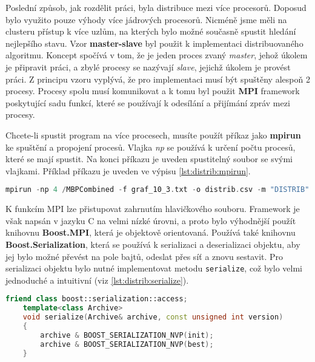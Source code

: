 Poslední způsob, jak rozdělit práci, byla distribuce mezi více procesorů.
Doposud bylo využito pouze výhody více jádrových procesorů.
Nicméně jsme měli na clusteru přístup k více uzlům, na kterých bylo možné současně spustit hledání nejlepšího stavu.
Vzor \textbf{master-slave} byl použit k implementaci distribuovaného algoritmu.
Koncept spočívá v tom, že je jeden proces zvaný \textit{master}, jehož úkolem je připravit práci, a zbylé procesy se nazývají \textit{slave}, jejichž úkolem je provést práci.
Z principu vzoru vyplývá, že pro implementaci musí být spuštěny alespoň 2 procesy.
Procesy spolu musí komunikovat a k tomu byl použit \textbf{MPI} framework poskytující sadu funkcí, které se používají k odesílání a přijímání zpráv mezi procesy.

Chcete-li spustit program na více procesech, musíte použít příkaz jako \textbf{mpirun} ke spuštění a propojení procesů.
Vlajka \textit{np} se používá k určení počtu procesů, které se mají spustit.
Na konci příkazu je uveden spustitelný soubor se svými vlajkami.
Příklad příkazu je uveden ve výpisu \ref{lst:distrib:mpirun}.

\begin{lstlisting}[language=C++, label={lst:distrib:mpirun}, caption={Příklad použití příkazu mpirun}]
mpirun -np 4 /MBPCombined -f graf_10_3.txt -o distrib.csv -m "DISTRIB" -dm 4 -ds 4 -t 3
\end{lstlisting}

K funkcím MPI lze přistupovat zahrnutím hlavičkového souboru.
Framework je však napsán v jazyku C na velmi nízké úrovni, a proto bylo výhodnější použít knihovnu \textbf{Boost.MPI}, která je objektově orientovaná.
Používá také knihovnu \textbf{Boost.Serialization}, která se používá k serializaci a deserializaci objektu, aby jej bylo možné převést na pole bajtů, odeslat přes síť a znovu sestavit.
Pro serializaci objektu bylo nutné implementovat metodu \texttt{serialize}, což bylo velmi jednoduché a intuitivní (viz \ref{lst:distrib:serialize}).

\begin{lstlisting}[language=C++, label={lst:distrib:serialize}, caption={Příklad implementace metody serialize}]
    friend class boost::serialization::access;
    template<class Archive>
    void serialize(Archive& archive, const unsigned int version)
    {
        archive & BOOST_SERIALIZATION_NVP(init);
        archive & BOOST_SERIALIZATION_NVP(best);
    }
\end{lstlisting}

